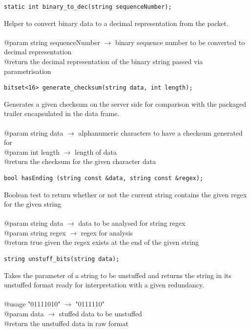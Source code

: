 \documentclass[12pt]{article}
\begin{document}
\begin{lstlisting}
static int binary_to_dec(string sequenceNumber);
\end{lstlisting}
Helper to convert binary data to a decimal representation from the packet.\\\\
@param string sequenceNumber $\rightarrow$ binary sequence number to be converted to decimal representation\\
@return the decimal representation of the binary string passed via parametrisation

\begin{lstlisting}
bitset<16> generate_checksum(string data, int length);
\end{lstlisting}
Generates a given checksum on the server side for comparison with the packaged trailer encapsulated in the data frame.\\\\
@param string data $\rightarrow$ alphanumeric characters to have a checksum generated for\\
@param int length $\rightarrow$ length of data \\
@return the checksum for the given character data

\begin{lstlisting}
bool hasEnding (string const &data, string const &regex);
\end{lstlisting}
Boolean test to return whether or not the current string contains the given regex for the given string\\\\
@param string data $\rightarrow$ data to be analysed for string regex\\
@param string regex $\rightarrow$ regex for analysis\\
@return true given the regex exists at the end of the given string

\begin{lstlisting}
string unstuff_bits(string data);
\end{lstlisting}
Takes the parameter of a string to be unstuffed and returns the string in its unstuffed format ready for interpretation with a given redundancy.\\\\
@usage "01111010" $\rightarrow$ "0111110"\\
@param data $\rightarrow$ stuffed data to be unstuffed\\
@return the unstuffed data in raw format
\end{document}
